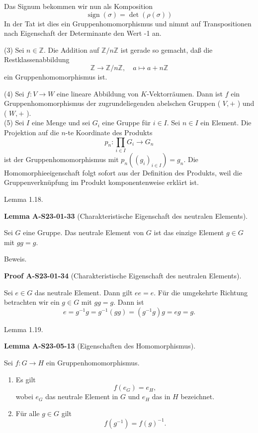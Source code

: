 \documentclass[10pt, letterpaper]{article}
\newcommand{\CustomHeading}[3]{%
  \par\medskip\noindent%
  \textbf{#1 #2} \textnormal{(#3)}.\enskip%
}
\newenvironment{LEM}[2]{\begin{unitbox}\CustomHeading{Lemma}{#1}{#2}}{\end{unitbox}}
\newenvironment{PROOF}[2]{\begin{unitbox}\CustomHeading{Proof}{#1}{#2}}{\end{unitbox}}
\begin{document}
Das Signum bekommen wir nun als Komposition
$$
\operatorname{sign}(\sigma)=\operatorname{det}(\rho(\sigma))
$$
In der Tat ist dies ein Gruppenhomomorphismus und nimmt auf Transpositionen nach Eigenschaft der Determinante den Wert -1 an.


(3) Sei $n \in \mathbb{Z}$. Die Addition auf $\mathbb{Z} / n \mathbb{Z}$ ist gerade so gemacht, daß die Restklassenabbildung
$$
\mathbb{Z} \rightarrow \mathbb{Z} / n \mathbb{Z}, \quad a \mapsto a+n \mathbb{Z}
$$
ein Gruppenhomomorphismus ist.


(4) Sei $f: V \rightarrow W$ eine lineare Abbildung von $K$-Vektorräumen. Dann ist $f$ ein Gruppenhomomorphismus der zugrundeliegenden abelschen Gruppen ( $V,+$ ) und ( $W,+$ ).\\


(5) Sei $I$ eine Menge und sei $G_{i}$ eine Gruppe für $i \in I$. Sei $n \in I$ ein Element. Die Projektion auf die $n$-te Koordinate des Produkts
$$
p_{n}: \prod_{i \in I} G_{i} \rightarrow G_{n}
$$
ist der Gruppenhomomorphismus mit $p_{n}\left(\left(g_{i}\right)_{i \in I}\right)=g_{n}$. Die Homomorphieeigenschaft folgt sofort aus der Definition des Produkts, weil die Gruppenverknüpfung im Produkt komponentenweise erklärt ist.


Lemma 1.18. 

\begin{LEM}{A-S23-01-33}{Charakteristische Eigenschaft des neutralen Elements}
Sei $G$ eine Gruppe. Das neutrale Element von $G$ ist das einzige Element $g \in G$ mit $g g=g$.
\end{LEM}

Beweis. 

\begin{PROOF}{A-S23-01-34}{Charakteristische Eigenschaft des neutralen Elements}
Sei $e \in G$ das neutrale Element. Dann gilt $e e=e$. Für die umgekehrte Richtung betrachten wir ein $g \in G$ mit $g g=g$. Dann ist
$$
e=g^{-1} g=g^{-1}(g g)=\left(g^{-1} g\right) g=e g=g .
$$
\end{PROOF}

Lemma 1.19. 


\begin{LEM}{A-S23-05-13}{Eigenschaften des Homomorphismus}
Sei $f: G \rightarrow H$ ein Gruppenhomomorphismus.
\begin{enumerate}
  \item Es gilt
  \[
    f(e_G) = e_H,
  \]
  wobei $e_G$ das neutrale Element in $G$ und $e_H$ das in $H$ bezeichnet.

  \item Für alle $g \in G$ gilt
  \[
    f(g^{-1}) = f(g)^{-1}.
  \]
\end{enumerate}
\end{LEM}
\end{document}
